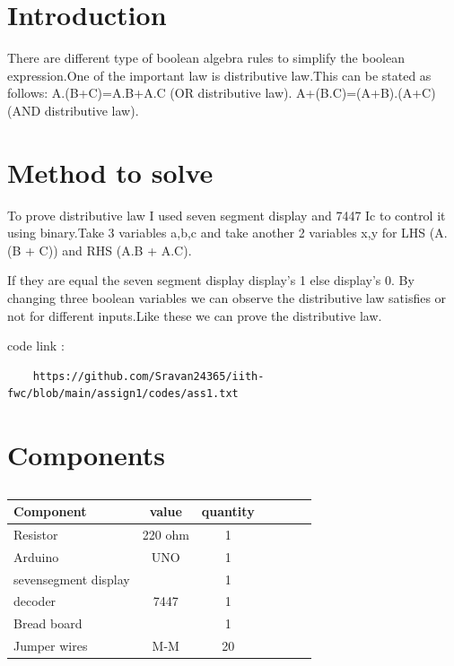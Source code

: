 \documentclass[10pt, a4paper]{article}
\title{\mytitle}
\author{\myauthor\hspace{1em}\\\contact\\IITH\hspace{0.5em}-\hspace{0.5em}\mymodule}
\date{}
\begin{document}
	\maketitle
\tableofcontents

\section{Introduction}

There are different type of boolean algebra rules to simplify the boolean expression.One of the important law is distributive law.This can be stated as follows:
         A.(B+C)=A.B+A.C (OR distributive law).
         A+(B.C)=(A+B).(A+C) (AND distributive law).


\section{Method to solve}


To prove distributive law I used seven segment display and 7447 Ic to control it using binary.Take 3 variables a,b,c and take another 2 variables x,y for LHS (A.(B + C)) and RHS (A.B + A.C). 

If they are equal the seven segment display display's 1 else display's 0. By changing three boolean variables we can observe the distributive law satisfies or not for different inputs.Like these we can prove the distributive law.

code link :
 \begin{lstlisting}
    https://github.com/Sravan24365/iith-fwc/blob/main/assign1/codes/ass1.txt
\end{lstlisting}

\section{Components}



\begin{table}[htbp]
 \begin{center}
    \begin{tabular}{|l|c|c|c|c|c|c} \hline \textbf{Component}
  & \textbf{value} & \textbf{quantity} \\
 \hline
Resistor & 220 ohm & 1 \\ \hline
Arduino & UNO & 1 \\ \hline
sevensegment display &  & 1 \\ \hline
decoder & 7447 & 1  \\ \hline
Bread board &  & 1 \\ \hline
Jumper wires & M-M & 20\\ \hline
\end{tabular}   
\end{center}
\caption{\label{table:dummytable} }
\end{table}
\end{document}
